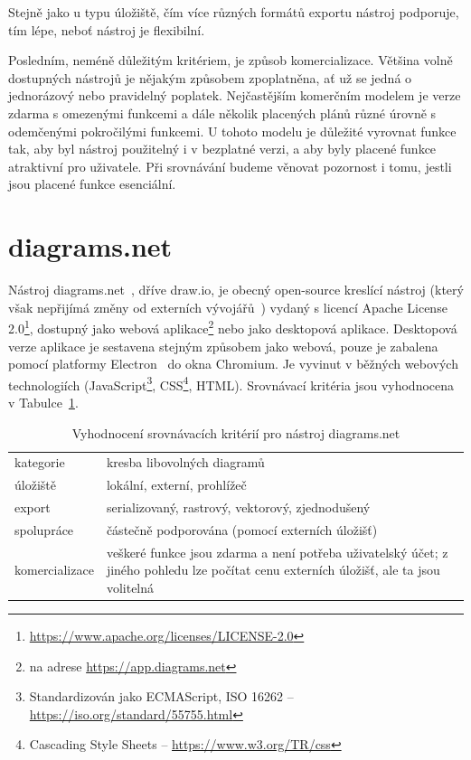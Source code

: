 Stejně jako u typu úložiště, čím více různých formátů exportu nástroj podporuje, tím lépe, neboť nástroj je flexibilní.

Posledním, neméně důležitým kritériem, je způsob komercializace.
Většina volně dostupných nástrojů je nějakým způsobem zpoplatněna, ať už se jedná o jednorázový nebo pravidelný poplatek.
Nejčastějším komerčním modelem je verze zdarma s omezenými funkcemi a dále několik placených plánů různé úrovně s odemčenými pokročilými funkcemi.
U tohoto modelu je důležité vyrovnat funkce tak, aby byl nástroj použitelný i v bezplatné verzi, a aby byly placené funkce atraktivní pro uživatele.
Při srovnávání budeme věnovat pozornost i tomu, jestli jsou placené funkce esenciální.

\section{diagrams.net}\label{section:drawio}

Nástroj diagrams.net~\cite{drawio_2023}, dříve draw.io, je obecný open-source kreslící nástroj
(který však nepřijímá změny od externích vývojářů~\cite{drawio_gh_2022}) %
vydaný s licencí Apache License 2.0\footnote{\url{https://www.apache.org/licenses/LICENSE-2.0}}, dostupný jako webová aplikace\footnote{na adrese \url{https://app.diagrams.net}} nebo jako desktopová aplikace.
Desktopová verze aplikace je sestavena stejným způsobem jako webová, pouze je zabalena pomocí platformy Electron~\cite{openjsfoundation_electron_2023} do okna Chromium.
Je vyvinut v běžných we\-bo\-vých tech\-no\-lo\-gi\-ích (Java\-Script\footnote{Standardizován jako ECMAScript, ISO 16262 -- \url{https://iso.org/standard/55755.html}}, CSS\footnote{Cascading Style Sheets -- \url{https://www.w3.org/TR/css}}, HTML).
Srovnávací kritéria jsou vyhodnocena v Tabulce~\ref{tab:comparison-diagramsnet}.

\begin{table}[!htb]
  \begin{tabularx}{\textwidth}{lX}\toprule
    kategorie      & kresba libovolných diagramů                                 \\
    úložiště       & lokální, externí, prohlížeč                                 \\
    export         & serializovaný, rastrový, vektorový, zjednodušený            \\
    spolupráce     & částečně podporována (pomocí externích úložišť)             \\
    komercializace & veškeré funkce jsou zdarma a není potřeba uživatelský účet;
    z jiného pohledu lze počítat cenu externích úložišť, ale ta jsou volitelná
    \\\bottomrule
  \end{tabularx}
  \caption{Vyhodnocení srovnávacích kritérií pro nástroj diagrams.net}
  \label{tab:comparison-diagramsnet}
\end{table}

